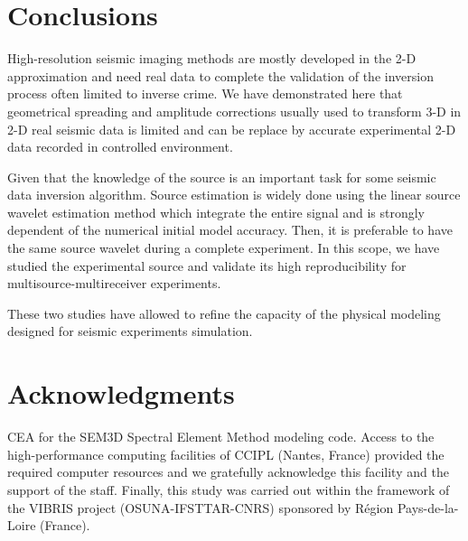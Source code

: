 \documentclass[manuscript,revised]{geophysics}
\newcommand{\twod}{2-D }
\newcommand{\thrd}{3-D }
\begin{document}

\section{Conclusions}

\noindent High-resolution seismic imaging methods are mostly developed in the \twod approximation and need real data to complete the validation of the inversion process often limited to inverse crime. We have demonstrated here that geometrical spreading and amplitude corrections usually used to transform \thrd in \twod real seismic data is limited and can be replace by accurate experimental \twod data recorded in controlled environment.

\noindent Given that the knowledge of the source is an important task for some seismic data inversion algorithm. Source estimation is widely done using the linear source wavelet estimation method which integrate the entire signal and is strongly dependent of the numerical initial model accuracy. Then, it is preferable to have the same source wavelet during a complete experiment. In this scope, we have studied the experimental source and validate its high reproducibility for multisource-multireceiver experiments. 
 
\noindent  These two studies have allowed to refine the capacity of the physical modeling designed for seismic experiments simulation. 


\section*{Acknowledgments}

\noindent CEA for the SEM3D Spectral Element Method modeling code. Access to the high-performance computing facilities of CCIPL (Nantes, France) provided the required computer resources and we gratefully acknowledge this facility and the support of the staff. Finally, this study was carried out within the framework of the VIBRIS project (OSUNA-IFSTTAR-CNRS) sponsored by R\'egion Pays-de-la-Loire (France).   
\end{document}
